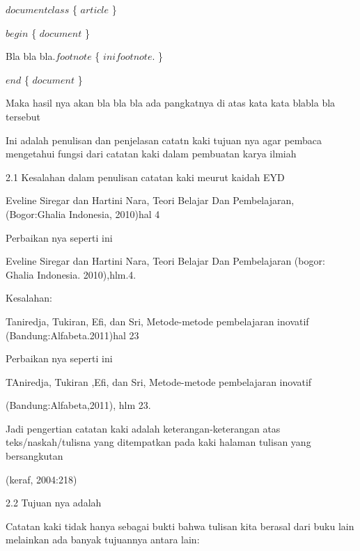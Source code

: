\begin{itemize}
$documentclass$ \{ $article$ \} \par

$begin$ \{ $document$ \} \par

Bla bla bla.$footnote$ \{ $ini footnote.$ \} \par

$end$ \{ $document$ \} \par

Maka hasil nya akan bla bla bla ada pangkatnya di atas kata kata blabla bla tersebut\par

Ini adalah penulisan dan penjelasan catatn kaki tujuan nya agar pembaca mengetahui fungsi dari catatan kaki dalam pembuatan karya ilmiah\par

2.1 Kesalahan dalam penulisan catatan kaki meurut kaidah EYD\par

Eveline Siregar dan Hartini Nara, Teori Belajar Dan Pembelajaran, (Bogor:Ghalia Indonesia, 2010)hal 4\par

Perbaikan nya seperti ini\par

Eveline Siregar dan Hartini Nara, Teori Belajar Dan Pembelajaran (bogor: Ghalia Indonesia. 2010),hlm.4.\par

Kesalahan:\par

Taniredja, Tukiran, Efi, dan Sri, Metode-metode pembelajaran inovatif (Bandung:Alfabeta.2011)hal 23\par

Perbaikan nya seperti ini\par

TAniredja, Tukiran ,Efi, dan Sri, Metode-metode pembelajaran inovatif\par

(Bandung:Alfabeta,2011), hlm 23.\par

Jadi pengertian catatan kaki adalah keterangan-keterangan atas teks/naskah/tulisna yang ditempatkan pada kaki halaman tulisan yang bersangkutan\par

(keraf, 2004:218)\par

2.2 Tujuan nya adalah\par

Catatan kaki tidak hanya sebagai bukti bahwa tulisan kita berasal dari buku lain melainkan ada banyak tujuannya antara lain:\par


\end{itemize}
